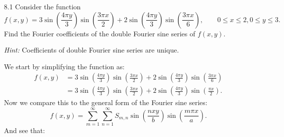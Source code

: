 
\begin{problem}{8.1}
  Consider the function
  \[ 
  f(x,y) = 3 \sin \left( \frac{4 \pi y}{3} \right) \sin \left( \frac{3 \pi x}{2} \right) + 2 \sin \left( \frac{4 \pi y}{3} \right) \sin \left( \frac{3 \pi x}{6} \right), \qquad 0 \leq x \leq 2, 0 \leq y \leq 3
  .\]
  Find the Fourier coefficients of the double Fourier sine series of $f(x,y)$.

  \textit{Hint:} Coefficients of double Fourier sine series are unique.
\end{problem}

\begin{derivation}
  We start by simplifying the function as:
  \begin{align*}
    f(x,y) &= 3 \sin \left( \frac{4 \pi y}{3} \right) \sin \left( \frac{3 \pi x}{2} \right) + 2 \sin \left( \frac{4 \pi y}{3} \right) \sin \left( \frac{3 \pi x}{6} \right) \\
           &= 3 \sin \left( \frac{4 \pi y}{3} \right) \sin \left( \frac{3 \pi x}{2} \right) + 2 \sin \left( \frac{4 \pi y}{3} \right) \sin \left( \frac{\pi x}{2} \right)
  .\end{align*}
  Now we compare this to the general form of the Fourier sine series:
  \[ 
  f(x,y) = \sum_{m = 1}^{\infty} \sum_{n = 1}^{\infty} S_{m,n} \sin \left( \frac{n x y}{b} \right) \sin \left( \frac{m \pi x}{a} \right)
  .\]
  And see that:
\end{derivation}

